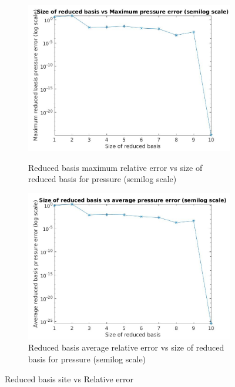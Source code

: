 \documentclass[a4paper,oneside,openright,spanish,english]{book}
\begin{document}
  \begin{figure}\ContinuedFloat
  \begin{subfigure}{\textwidth}
  \includegraphics[width=\linewidth,height=0.45\textheight]{same_train_test/size_vs_maximum_reduced_basis_pressure_error_semilog.jpg}
  \caption{Reduced basis maximum relative error vs size of reduced basis for pressure (semilog scale)}
  \label{rb_max_pressure_error_vs_size} 
    \includegraphics[width=\linewidth,height=0.45\textheight]{same_train_test/size_vs_average_reduced_basis_pressure_error_semilog.jpg}
  \caption{Reduced basis average relative error vs size of reduced basis for pressure (semilog scale)}
  \label{rb_avg_pressure_error_vs_size} 
\end{subfigure}
\caption{Reduced basis site vs Relative error}
\label{rb_error_vs_size_2}
\end{figure}
\end{document}
